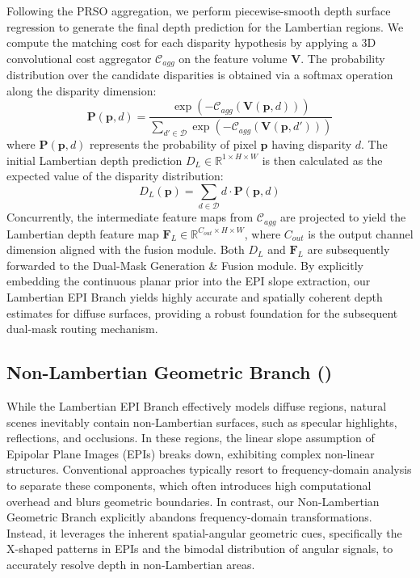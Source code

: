 \documentclass[lettersize,journal]{IEEEtran}
\begin{document}
Following the PRSO aggregation, we perform piecewise-smooth depth surface regression to generate the final depth prediction for the Lambertian regions. We compute the matching cost for each disparity hypothesis by applying a 3D convolutional cost aggregator $\mathcal{C}_{agg}$ on the feature volume $\mathbf{V}$. The probability distribution over the candidate disparities is obtained via a softmax operation along the disparity dimension:
\begin{equation}
\label{eq:eq10}
\mathbf{P}(\mathbf{p}, d) = \frac{\exp(-\mathcal{C}_{agg}(\mathbf{V}(\mathbf{p}, d)))}{\sum_{d' \in \mathcal{D}} \exp(-\mathcal{C}_{agg}(\mathbf{V}(\mathbf{p}, d')))}
\end{equation}
where $\mathbf{P}(\mathbf{p}, d)$ represents the probability of pixel $\mathbf{p}$ having disparity $d$. The initial Lambertian depth prediction $D_L \in \mathbb{R}^{1 \times H \times W}$ is then calculated as the expected value of the disparity distribution:
\begin{equation}
\label{eq:eq11}
D_L(\mathbf{p}) = \sum_{d \in \mathcal{D}} d \cdot \mathbf{P}(\mathbf{p}, d)
\end{equation}
Concurrently, the intermediate feature maps from $\mathcal{C}_{agg}$ are projected to yield the Lambertian depth feature map $\mathbf{F}_L \in \mathbb{R}^{C_{out} \times H \times W}$, where $C_{out}$ is the output channel dimension aligned with the fusion module. Both $D_L$ and $\mathbf{F}_L$ are subsequently forwarded to the Dual-Mask Generation \& Fusion module. By explicitly embedding the continuous planar prior into the EPI slope extraction, our Lambertian EPI Branch yields highly accurate and spatially coherent depth estimates for diffuse surfaces, providing a robust foundation for the subsequent dual-mask routing mechanism.

\subsection{Non-Lambertian Geometric Branch ()}

While the Lambertian EPI Branch effectively models diffuse regions, natural scenes inevitably contain non-Lambertian surfaces, such as specular highlights, reflections, and occlusions. In these regions, the linear slope assumption of Epipolar Plane Images (EPIs) breaks down, exhibiting complex non-linear structures. Conventional approaches typically resort to frequency-domain analysis to separate these components, which often introduces high computational overhead and blurs geometric boundaries. In contrast, our Non-Lambertian Geometric Branch explicitly abandons frequency-domain transformations. Instead, it leverages the inherent spatial-angular geometric cues, specifically the X-shaped patterns in EPIs and the bimodal distribution of angular signals, to accurately resolve depth in non-Lambertian areas.
\end{document}
